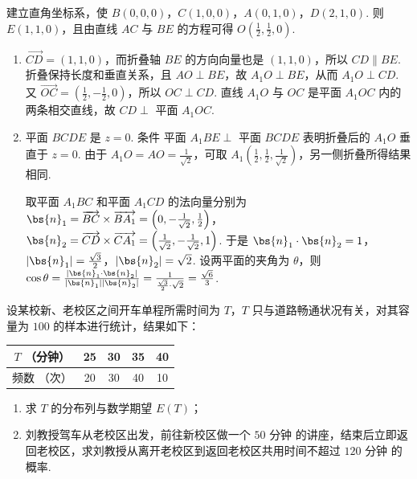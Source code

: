 \begin{solution}
建立直角坐标系，使
\(B(0,0,0)\)，\(C(1,0,0)\)，\(A(0,1,0)\)，\(D(2,1,0)\). 则 \(E(1,1,0)\)，且由直线 \(AC\) 与 \(BE\) 的方程可得 \(O\left(\frac{1}{2},\frac{1}{2},0\right)\).

\begin{enumerate}
\item \(\overrightarrow{CD}=(1,1,0)\)，而折叠轴 \(BE\) 的方向向量也是 \((1,1,0)\)，所以 \(CD\parallel BE\). 折叠保持长度和垂直关系，且 \(AO\perp BE\)，故 \(A_{1}O\perp BE\)，从而 \(A_{1}O\perp CD\). 又
\(\overrightarrow{OC}=\left(\frac{1}{2},-\frac{1}{2},0\right)\)，所以 \(OC\perp CD\). 直线 \(A_{1}O\) 与 \(OC\) 是平面 \(A_{1}OC\) 内的两条相交直线，故 \(CD\perp\) 平面 \(A_{1}OC\).

\item 平面 \(BCDE\) 是 \(z=0\). 条件 \(\text{平面 }A_{1}BE\perp\text{ 平面 }BCDE\) 表明折叠后的 \(A_{1}O\) 垂直于 \(z=0\). 由于 \(A_{1}O=AO=\frac{1}{\sqrt{2}}\)，可取
\(A_{1}\left(\frac{1}{2},\frac{1}{2},\frac{1}{\sqrt{2}}\right)\)，另一侧折叠所得结果相同.

取平面 \(A_{1}BC\) 和平面 \(A_{1}CD\) 的法向量分别为
\(\bs{n}_{1}=\overrightarrow{BC}\times\overrightarrow{BA_{1}}=\left(0,-\frac{1}{\sqrt{2}},\frac{1}{2}\right)\)，
\(\bs{n}_{2}=\overrightarrow{CD}\times\overrightarrow{CA_{1}}=\left(\frac{1}{\sqrt{2}},-\frac{1}{\sqrt{2}},1\right)\).
于是
\(\bs{n}_{1}\cdot\bs{n}_{2}=1\)，\(\lvert\bs{n}_{1}\rvert=\frac{\sqrt{3}}{2}\)，\(\lvert\bs{n}_{2}\rvert=\sqrt{2}\). 设两平面的夹角为 \(\theta\)，则
\(\cos\theta=\frac{|\bs{n}_{1}\cdot\bs{n}_{2}|}{|\bs{n}_{1}||\bs{n}_{2}|}=\frac{1}{\frac{\sqrt{3}}{2}\cdot\sqrt{2}}=\frac{\sqrt{6}}{3}\).
\end{enumerate}
\end{solution}

\begin{problem}
设某校新、老校区之间开车单程所需时间为 \(T\)，\(T\) 只与道路畅通状况有关，对其容量为 \(100\) 的样本进行统计，结果如下：

\begin{center}
\small
\begin{tabular}{c|cccc}
\hline
\(T\) （分钟） & 25 & 30 & 35 & 40 \\
\hline
频数 （次） & 20 & 30 & 40 & 10 \\
\hline
\end{tabular}
\end{center}

\begin{enumerate}
\item 求 \(T\) 的分布列与数学期望 \(E(T)\)；
\item 刘教授驾车从老校区出发，前往新校区做一个 \(50\text{ 分钟}\) 的讲座，结束后立即返回老校区，求刘教授从离开老校区到返回老校区共用时间不超过 \(120\text{ 分钟}\) 的概率.
\end{enumerate}
\end{problem}

